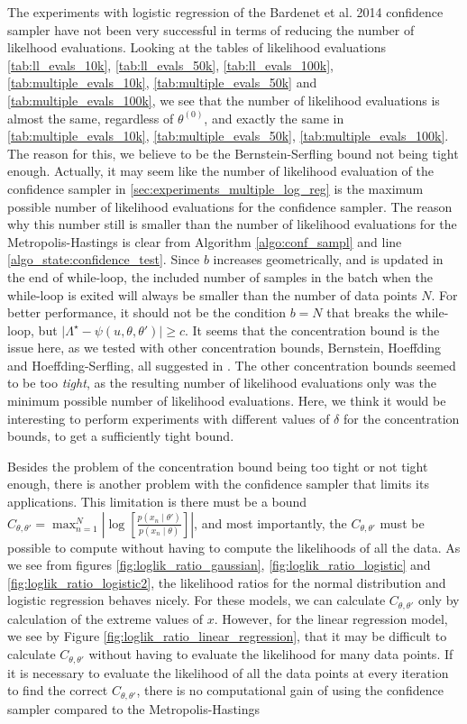 The experiments with logistic regression of the Bardenet et al. 2014 confidence sampler have not been very successful in terms of reducing the number of likelhood evaluations. Looking at the tables of likelihood evaluations \ref{tab:ll_evals_10k}, \ref{tab:ll_evals_50k}, \ref{tab:ll_evals_100k}, \ref{tab:multiple_evals_10k}, \ref{tab:multiple_evals_50k} and  \ref{tab:multiple_evals_100k}, we see that the number of likelihood evaluations is almost the same, regardless of $\theta^{\left(0\right)}$, and exactly the same in \ref{tab:multiple_evals_10k}, \ref{tab:multiple_evals_50k}, \ref{tab:multiple_evals_100k}. The reason for this, we believe to be the Bernstein-Serfling bound not being tight enough. Actually, it may seem like the number of likelihood evaluation of the confidence sampler in \ref{sec:experiments_multiple_log_reg} is the maximum possible number of likelihood evaluations for the confidence sampler. The reason why this number still is smaller than the number of likelihood evaluations for the Metropolis-Hastings is clear from Algorithm \ref{algo:conf_sampl} and line \ref{algo_state:confidence_test}. Since $b$ increases geometrically, and is updated in the end of while-loop, the included number of samples in the batch when the while-loop is exited will always be smaller than the number of data points $N$. For better performance, it should not be the condition $b = N$ that breaks the while-loop, but $\mid \Lambda
^{\star}- \psi\left(u, \theta, \theta'\right)\mid \geq c$. It seems that the concentration bound is the issue here, as we tested with other concentration bounds, Bernstein, Hoeffding and Hoeffding-Serfling, all suggested in \cite{bardenet2015concentration}. The other concentration bounds seemed to be too \textit{tight}, as the resulting number of likelihood evaluations only was the minimum possible number of likelihood evaluations. Here, we think it would be interesting to perform experiments with different values of $\delta$ for the concentration bounds, to get a sufficiently tight bound. 

Besides the problem of the concentration bound being too tight or not tight enough, there is another problem with the confidence sampler that limits its applications.
This limitation is there must be a bound $C_{\theta, \theta'} =  \max_{n=1}^N\left| \log\left[\frac{p\left(x_n\mid \theta'\right)}{p\left(x_n\mid \theta\right)}\right]\right|$,
and most importantly, the $C_{\theta, \theta'}$ must be possible to compute without having to compute the likelihoods of all the data. As we see from figures \ref{fig:loglik_ratio_gaussian}, \ref{fig:loglik_ratio_logistic} and \ref{fig:loglik_ratio_logistic2}, the likelihood ratios for the normal distribution and logistic regression behaves nicely. For these models, we can calculate $C_{\theta, \theta'}$ only by calculation of the extreme values of $x$. However, for the linear regression model, we see by Figure \ref{fig:loglik_ratio_linear_regression}, that it may be difficult to calculate $C_{\theta, \theta'}$ without having to evaluate the likelihood for many data points. If it is necessary to evaluate the likelihood of all the data points at every iteration to find the correct $C_{\theta, \theta'}$, there is no computational gain of using the confidence sampler compared to the Metropolis-Hastings 

